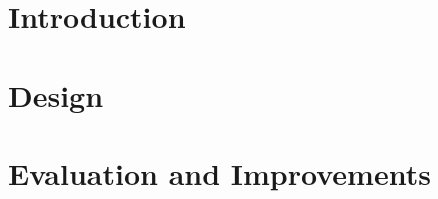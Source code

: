 \documentclass[11pt, a4paper, oneside]{Thesis} %
\begin{document}

\mainmatter %

\pagestyle{fancy} %


\part{Introduction}

 

\part{Design}
 
 
 
\part{Evaluation and Improvements}
 




\appendix %

%
%
%


\backmatter


\label{Bibliography}



\end{document}
